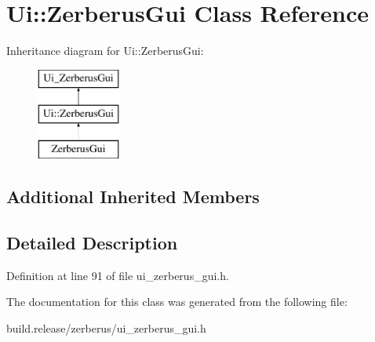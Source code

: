 \hypertarget{class_ui_1_1_zerberus_gui}{}\section{Ui\+:\+:Zerberus\+Gui Class Reference}
\label{class_ui_1_1_zerberus_gui}
Inheritance diagram for Ui\+:\+:Zerberus\+Gui\+:\begin{figure}[H]
\begin{center}
\leavevmode
\includegraphics[height=3.000000cm]{class_ui_1_1_zerberus_gui}
\end{center}
\end{figure}
\subsection*{Additional Inherited Members}


\subsection{Detailed Description}


Definition at line 91 of file ui\+\_\+zerberus\+\_\+gui.\+h.



The documentation for this class was generated from the following file\+:\begin{DoxyCompactItemize}
\item 
build.\+release/zerberus/ui\+\_\+zerberus\+\_\+gui.\+h\end{DoxyCompactItemize}
